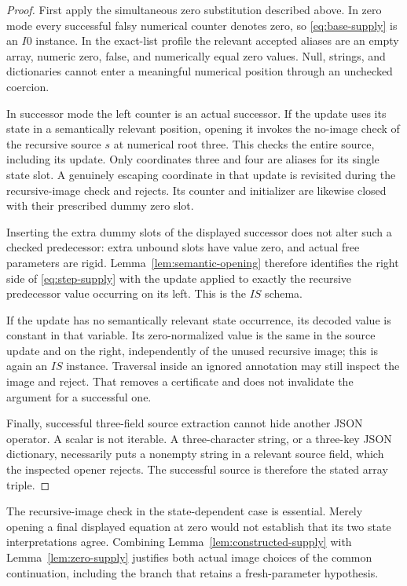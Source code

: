 \documentclass[11pt,letterpaper]{article}
\theoremstyle{definition}\newtheorem{definition}[theorem]{Definition}
\theoremstyle{remark}\newtheorem{remark}[theorem]{Remark}
\begin{document}
\begin{proof}
First apply the simultaneous zero substitution described above.  In
zero mode every successful falsy numerical counter denotes zero, so
\eqref{eq:base-supply} is an $I0$ instance.  In the exact-list profile
the relevant accepted aliases are an empty array, numeric zero, false,
and numerically equal zero values.  Null, strings, and dictionaries
cannot enter a meaningful numerical position through an unchecked
coercion.

In successor mode the left counter is an actual successor.  If the
update uses its state in a semantically relevant position, opening it
invokes the no-image check of the recursive source $s$ at numerical
root three.  This checks the entire source, including its update.
Only coordinates three and four are aliases for its single state slot.
A genuinely escaping coordinate in that update is revisited during
the recursive-image check and rejects.  Its counter and initializer
are likewise closed with their prescribed dummy zero slot.

Inserting the extra dummy slots of the displayed successor does not
alter such a checked predecessor: extra unbound slots have value zero,
and actual free parameters are rigid.  Lemma~\ref{lem:semantic-opening}
therefore identifies the right side of \eqref{eq:step-supply} with the
update applied to exactly the recursive predecessor value occurring
on its left.  This is the $IS$ schema.

If the update has no semantically relevant state occurrence, its
decoded value is constant in that variable.  Its zero-normalized value
is the same in the source update and on the right, independently of
the unused recursive image; this is again an $IS$ instance.  Traversal
inside an ignored annotation may still inspect the image and reject.
That removes a certificate and does not invalidate the argument for a
successful one.

Finally, successful three-field source extraction cannot hide another
JSON operator.  A scalar is not iterable.  A three-character string,
or a three-key JSON dictionary, necessarily puts a nonempty string in
a relevant source field, which the inspected opener rejects.  The
successful source is therefore the stated array triple.
\end{proof}

The recursive-image check in the state-dependent case is essential.
Merely opening a final displayed equation at zero would not establish
that its two state interpretations agree.  Combining
Lemma~\ref{lem:constructed-supply} with Lemma~\ref{lem:zero-supply}
justifies both actual image choices of the common continuation, including
the branch that retains a fresh-parameter hypothesis.
\end{document}
